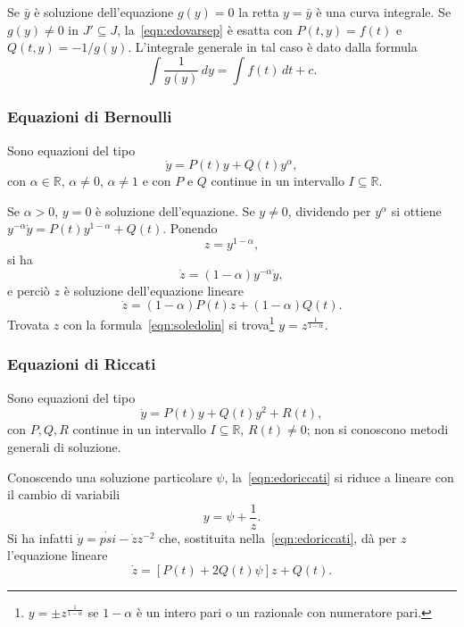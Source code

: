\documentclass[a4paper]{book}
\numberwithin{equation}{section}
\theoremstyle{plain}
\theoremstyle{definition}
\theoremstyle{remark}
\theoremstyle{example}
\begin{document}
		Se $\bar{y}$ è soluzione dell'equazione $g(y) = 0$ la retta $y= \bar{y}$ è una curva integrale. Se $g(y) \ne 0$ in  $J' \subseteq J$, la~\eqref{eqn:edovarsep} è esatta con $P(t,y) = f(t)$ e $Q(t,y) = -1/g(y)$. L'integrale generale in tal caso è dato dalla formula
		 	\begin{equation}
				\int \frac{1}{g(y)}\,dy = \int f(t)\,dt + c.
			\end{equation}

			\subsubsection{Equazioni di Bernoulli}
			Sono equazioni del tipo
				\begin{equation}
					\dot{y} = P(t)y + Q(t)y^{\alpha},
				\end{equation}
			con $\alpha \in \mathbb{R}$, $\alpha \ne 0$, $\alpha \ne 1$ e con $P$ e $Q$ continue in un intervallo $I \subseteq \mathbb{R}$.

			Se $\alpha > 0$, $y = 0$ è soluzione dell'equazione. Se $y \ne 0$, dividendo per $y^{\alpha}$ si ottiene $y^{-\alpha}\dot{y} = P(t)y^{1-\alpha} + Q(t)$. Ponendo
				\begin{equation*}
					z = y^{1 - \alpha},
				\end{equation*}
			si ha
				\begin{equation*}
					\dot{z} = (1- \alpha)y^{-\alpha}\dot{y},
				\end{equation*}
			e perciò $z$ è soluzione dell'equazione lineare
				\begin{equation}
					\dot{z} = (1 - \alpha)P(t)z + (1 - \alpha)Q(t).
				\end{equation}
			Trovata $z$ con la formula~\eqref{eqn:soledolin} si trova\footnote{$y = \pm z^{\frac{1}{1-\alpha}}$ se $1 - \alpha$ è un intero pari o un razionale con numeratore pari.} $y = z^{\frac{1}{1-\alpha}}$.

			\subsubsection{Equazioni di Riccati}
			Sono equazioni del tipo
			 	\begin{equation}
					\label{eqn:edoriccati}
					\dot{y} = P(t)y + Q(t)y^2 + R(t),
				\end{equation}
			con $P, Q, R$ continue in un intervallo $I \subseteq \mathbb{R}$, $R(t) \ne 0$; non si conoscono metodi generali di soluzione.

			Conoscendo una soluzione particolare $\psi$, la~\eqref{eqn:edoriccati} si riduce a lineare con il cambio di variabili
				\begin{equation*}
					y = \psi + \frac{1}{z}.
				\end{equation*}
Si ha infatti $\dot{y} = \dot{psi} - \dot{z}z^{-2}$ che, sostituita nella~\eqref{eqn:edoriccati}, dà per $z$ l'equazione lineare
	\begin{equation*}
		\dot{z} = [P(t) + 2Q(t)\psi]z + Q(t).
	\end{equation*}
\end{document}
